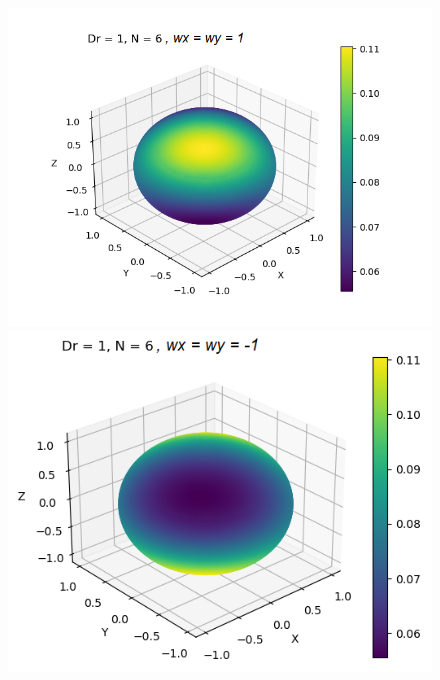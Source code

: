 \begin{frame}
	\begin{figure}[H]
	\centering
	\begin{minipage}{0.4\textwidth}
		\includegraphics[scale=0.33]{Bilder_wxwy/Sol_onSphere_wx=1=wy_Dr=1_N=6}
	\end{minipage}
	\hfill 
	\begin{minipage}{0.4\textwidth}
		\includegraphics[scale=0.33]{Bilder_wxwy/Sol_onSphere_wx=-1=wy_Dr=1_N=6}
	\end{minipage}
    \end{figure}


\end{frame}
